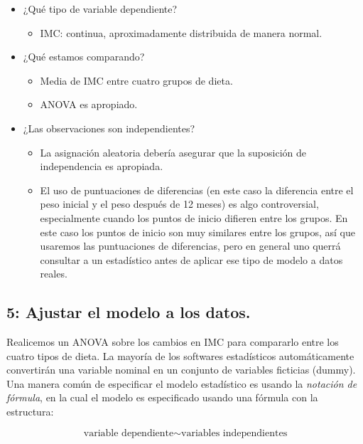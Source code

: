 \documentclass[
  12pt,
]{book}
\providecommand{\tightlist}{%
  \setlength{\itemsep}{0pt}\setlength{\parskip}{0pt}}
\begin{document}
\begin{itemize}
\tightlist
\item
  ¿Qué tipo de variable dependiente?

  \begin{itemize}
  \tightlist
  \item
    IMC: continua, aproximadamente distribuida de manera normal.
  \end{itemize}
\item
  ¿Qué estamos comparando?

  \begin{itemize}
  \tightlist
  \item
    Media de IMC entre cuatro grupos de dieta.
  \item
    ANOVA es apropiado.
  \end{itemize}
\item
  ¿Las observaciones son independientes?

  \begin{itemize}
  \tightlist
  \item
    La asignación aleatoria debería asegurar que la suposición de independencia es apropiada.
  \item
    El uso de puntuaciones de diferencias (en este caso la diferencia entre el peso inicial y el peso después de 12 meses) es algo controversial, especialmente cuando los puntos de inicio difieren entre los grupos. En este caso los puntos de inicio son muy similares entre los grupos, así que usaremos las puntuaciones de diferencias, pero en general uno querrá consultar a un estadístico antes de aplicar ese tipo de modelo a datos reales.
  \end{itemize}
\end{itemize}

\hypertarget{ajustar-el-modelo-a-los-datos.}{%
\subsection{5: Ajustar el modelo a los datos.}\label{ajustar-el-modelo-a-los-datos.}}

Realicemos un ANOVA sobre los cambios en IMC para compararlo entre los cuatro tipos de dieta. La mayoría de los softwares estadísticos automáticamente convertirán una variable nominal en un conjunto de variables ficticias (dummy). Una manera común de especificar el modelo estadístico es usando la \emph{notación de fórmula}, en la cual el modelo es especificado usando una fórmula con la estructura:

\[ 
\text{variable dependiente} \sim \text{variables independientes}
\]
\end{document}
